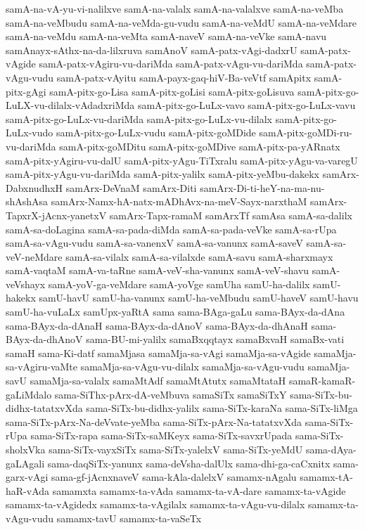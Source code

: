 {samA-na-vA-yu-vi-nalilxve
samA-na-valalx
samA-na-valalxve
samA-na-veMba
samA-na-veMbudu
samA-na-veMda-gu-vudu
samA-na-veMdU
samA-na-veMdare
samA-na-veMdu
samA-na-veMta
samA-naveV
samA-na-veVke
samA-navu
samAnayx-sAthx-na-da-lilxruva
samAnoV
samA-patx-vAgi-dadxrU
samA-patx-vAgide
samA-patx-vAgiru-vu-dariMda
samA-patx-vAgu-vu-dariMda
samA-patx-vAgu-vudu
samA-patx-vAyitu
samA-payx-gaq-hiV-Ba-veVtf
samApitx
samA-pitx-gAgi
samA-pitx-go-Lisa
samA-pitx-goLisi
samA-pitx-goLisuva
samA-pitx-go-LuLX-vu-dilalx-vAdadxriMda
samA-pitx-go-LuLx-vavo
samA-pitx-go-LuLx-vavu
samA-pitx-go-LuLx-vu-dariMda
samA-pitx-go-LuLx-vu-dilalx
samA-pitx-go-LuLx-vudo
samA-pitx-go-LuLx-vudu
samA-pitx-goMDide
samA-pitx-goMDi-ru-vu-dariMda
samA-pitx-goMDitu
samA-pitx-goMDive
samA-pitx-pa-yARnatx
samA-pitx-yAgiru-vu-dalU
samA-pitx-yAgu-TiTxralu
samA-pitx-yAgu-va-varegU
samA-pitx-yAgu-vu-dariMda
samA-pitx-yalilx
samA-pitx-yeMbu-dakekx
samArx-DabxnudhxH
samArx-DeVnaM
samArx-Diti
samArx-Di-ti-heY-na-ma-nu-shAshAsa
samArx-Namx-hA-natx-mADhAvx-na-meV-Sayx-narxthaM
samArx-TapxrX-jAcnx-yanetxV
samArx-Tapx-ramaM
samArxTf
samAsa
samA-sa-dalilx
samA-sa-doLagina
samA-sa-pada-diMda
samA-sa-pada-veVke
samA-sa-rUpa
samA-sa-vAgu-vudu
samA-sa-vanenxV
samA-sa-vanunx
samA-saveV
samA-sa-veV-neMdare
samA-sa-vilalx
samA-sa-vilalxde
samA-savu
samA-sharxmayx
samA-vaqtaM
samA-va-taRne
samA-veV-sha-vanunx
samA-veV-shavu
samA-veVshayx
samA-yoV-ga-veMdare
samA-yoVge
samUha
samU-ha-dalilx
samU-hakekx
samU-havU
samU-ha-vanunx
samU-ha-veMbudu
samU-haveV
samU-havu
samU-ha-vuLaLx
samUpx-yaRtA
sama
sama-BAga-gaLu
sama-BAyx-da-dAna
sama-BAyx-da-dAnaH
sama-BAyx-da-dAnoV
sama-BAyx-da-dhAnaH
sama-BAyx-da-dhAnoV
sama-BU-mi-yalilx
samaBxqqtayx
samaBxvaH
samaBx-vati
samaH
sama-Ki-datf
samaMjasa
samaMja-sa-vAgi
samaMja-sa-vAgide
samaMja-sa-vAgiru-vaMte
samaMja-sa-vAgu-vu-dilalx
samaMja-sa-vAgu-vudu
samaMja-savU
samaMja-sa-valalx
samaMtAdf
samaMtAtutx
samaMtataH
samaR-kamaR-gaLiMdalo
sama-SiThx-pArx-dA-veMbuva
samaSiTx
samaSiTxY
sama-SiTx-bu-didhx-tatatxvXda
sama-SiTx-bu-didhx-yalilx
sama-SiTx-karaNa
sama-SiTx-liMga
sama-SiTx-pArx-Na-deVvate-yeMba
sama-SiTx-pArx-Na-tatatxvXda
sama-SiTx-rUpa
sama-SiTx-rapa
sama-SiTx-saMKeyx
sama-SiTx-savxrUpada
sama-SiTx-sholxVka
sama-SiTx-vayxSiTx
sama-SiTx-yalelxV
sama-SiTx-yeMdU
sama-dAya-gaLAgali
sama-daqSiTx-yanunx
sama-deVsha-dalUlx
sama-dhi-ga-caCxnitx
sama-garx-vAgi
sama-gf-jAcnxnaveV
sama-kAla-dalelxV
samamx-nAgalu
samamx-tA-haR-vAda
samamxta
samamx-ta-vAda
samamx-ta-vA-dare
samamx-ta-vAgide
samamx-ta-vAgidedx
samamx-ta-vAgilalx
samamx-ta-vAgu-vu-dilalx
samamx-ta-vAgu-vudu
samamx-tavU
samamx-ta-vaSeTx
}
